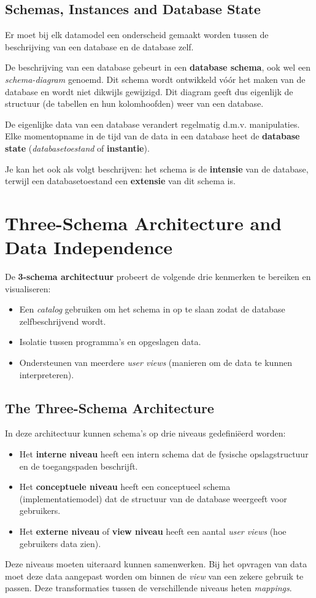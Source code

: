 \subsection{Schemas, Instances and Database State}
Er moet bij elk datamodel een onderscheid gemaakt worden tussen de beschrijving van een database en de database zelf.

De beschrijving van een database gebeurt in een \textbf{database schema}, ook wel een \textit{schema-diagram} genoemd. Dit schema wordt ontwikkeld v\'o\'or het maken van de database en wordt niet dikwijls gewijzigd. Dit diagram geeft dus eigenlijk de structuur (de tabellen en hun kolomhoofden) weer van een database.

De eigenlijke data van een database verandert regelmatig d.m.v. manipulaties. Elke momentopname in de tijd van de data in een database heet de \textbf{database state} (\textit{databasetoestand} of \textbf{instantie}).

Je kan het ook als volgt beschrijven: het schema is de \textbf{intensie} van de database, terwijl een databasetoestand een \textbf{extensie} van dit schema is.


\section{Three-Schema Architecture and Data Independence}
De \textbf{3-schema architectuur} probeert de volgende drie kenmerken te bereiken en visualiseren:
\begin{itemize}
\item Een \textit{catalog} gebruiken om het schema in op te slaan zodat de database zelfbeschrijvend wordt.
\item Isolatie tussen programma's en opgeslagen data.
\item Ondersteunen van meerdere \textit{user views} (manieren om de data te kunnen interpreteren).
\end{itemize}

\subsection{The Three-Schema Architecture}
In deze architectuur kunnen schema's op drie niveaus gedefini\"eerd worden:
\begin{itemize}
\item Het \textbf{interne niveau} heeft een intern schema dat de fysische opslagstructuur en de toegangspaden beschrijft.
\item Het \textbf{conceptuele niveau} heeft een conceptueel schema (implementatiemodel) dat de structuur van de database weergeeft voor gebruikers.
\item Het \textbf{externe niveau} of \textbf{view niveau} heeft een aantal \textit{user views} (hoe gebruikers data zien).
\end{itemize}
Deze niveaus moeten uiteraard kunnen samenwerken. Bij het opvragen van data moet deze data aangepast worden om binnen de \textit{view} van een zekere gebruik te passen. Deze transformaties tussen de verschillende niveaus heten \textit{mappings}.

